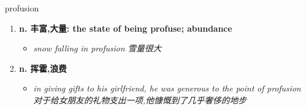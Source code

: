 
\begin{frame}
{\huge profusion}
\begin{center}
\begin{enumerate}\Large
  \item \textbf{n. 丰富,大量: the state of being profuse; abundance}
  \begin{itemize}
    \item \em{\Large{snow falling in profusion 雪量很大}}
  \end{itemize}
  \item \textbf{n. 挥霍,浪费}
  \begin{itemize}
    \item \em{\Large{in giving gifts to his girlfriend, he was generous to the point of profusion 对于给女朋友的礼物支出一项,他慷慨到了几乎奢侈的地步}}
  \end{itemize}
\end{enumerate}
\end{center}
\end{frame}
